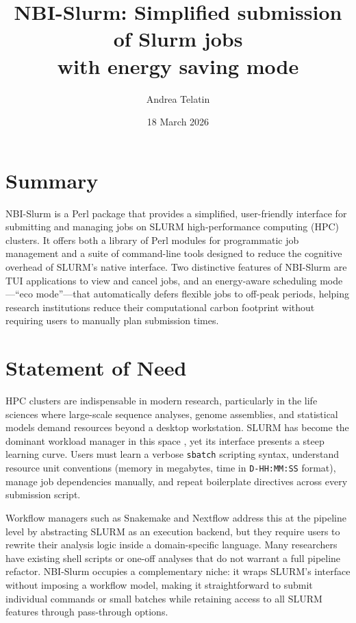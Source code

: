 \documentclass[11pt,a4paper]{article}
\title{\textbf{NBI-Slurm: Simplified submission of Slurm jobs\\with energy saving mode}}
\author[1,2]{Andrea Telatin\orcid{0000-0001-7619-281X}}
\affil[1]{Quadram Institute Bioscience, Norwich, NR4 7UQ, UK}
\affil[2]{Center for Microbial Interactions, Norwich Research Park, Norwich, NR4 7UG, UK}
\date{18 March 2026}
\begin{document}
\maketitle
\thispagestyle{empty}

\section{Summary}

NBI-Slurm is a Perl package that provides a simplified, user-friendly interface for submitting
and managing jobs on SLURM \cite{jette2002slurm} high-performance computing (HPC) clusters.
It offers both a library of Perl modules for programmatic job management and a suite of
command-line tools designed to reduce the cognitive overhead of SLURM's native interface.
Two distinctive features of NBI-Slurm are TUI applications to view and cancel jobs, and an
energy-aware scheduling mode---``eco mode''---that automatically defers flexible jobs to
off-peak periods, helping research institutions reduce their computational carbon footprint
without requiring users to manually plan submission times.

\section{Statement of Need}

HPC clusters are indispensable in modern research, particularly in the life sciences where
large-scale sequence analyses, genome assemblies, and statistical models demand resources
beyond a desktop workstation.
SLURM has become the dominant workload manager in this space \cite{slurm_adoption}, yet its
interface presents a steep learning curve.
Users must learn a verbose \texttt{sbatch} scripting syntax, understand resource unit
conventions (memory in megabytes, time in \texttt{D-HH:MM:SS} format), manage job
dependencies manually, and repeat boilerplate directives across every submission script.

Workflow managers such as Snakemake \cite{molder2021snakemake} and Nextflow
\cite{di2017nextflow} address this at the pipeline level by abstracting SLURM as an execution
backend, but they require users to rewrite their analysis logic inside a domain-specific
language.
Many researchers have existing shell scripts or one-off analyses that do not warrant a full
pipeline refactor.
NBI-Slurm occupies a complementary niche: it wraps SLURM's interface without imposing a
workflow model, making it straightforward to submit individual commands or small batches while
retaining access to all SLURM features through pass-through options.
\end{document}
